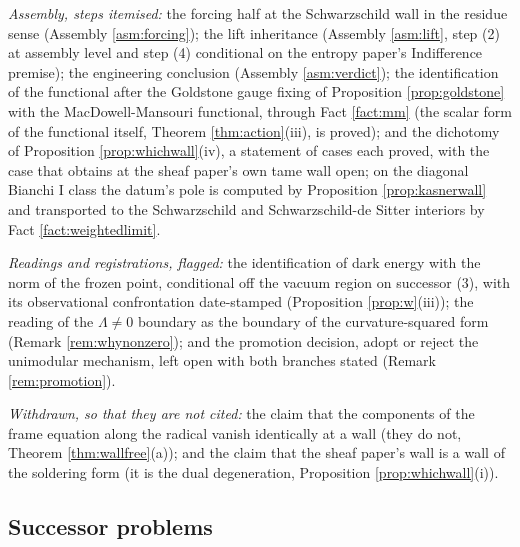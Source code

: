 \documentclass[11pt]{article}
\theoremstyle{definition}
\begin{document}
\emph{Assembly, steps itemised:} the forcing half at the Schwarzschild wall in the residue sense (Assembly \ref{asm:forcing}); the lift inheritance (Assembly \ref{asm:lift}, step (2) at assembly level and step (4) conditional on the entropy paper's Indifference premise); the engineering conclusion (Assembly \ref{asm:verdict}); the identification of the functional after the Goldstone gauge fixing of Proposition \ref{prop:goldstone} with the MacDowell-Mansouri functional, through Fact \ref{fact:mm} (the scalar form of the functional itself, Theorem \ref{thm:action}(iii), is proved); and the dichotomy of Proposition \ref{prop:whichwall}(iv), a statement of cases each proved, with the case that obtains at the sheaf paper's own tame wall open; on the diagonal Bianchi I class the datum's pole is computed by Proposition \ref{prop:kasnerwall} and transported to the Schwarzschild and Schwarzschild-de Sitter interiors by Fact \ref{fact:weightedlimit}.

\emph{Readings and registrations, flagged:} the identification of dark energy with the norm of the frozen point, conditional off the vacuum region on successor (3), with its observational confrontation date-stamped (Proposition \ref{prop:w}(iii)); the reading of the $\Lambda \neq 0$ boundary as the boundary of the curvature-squared form (Remark \ref{rem:whynonzero}); and the promotion decision, adopt or reject the unimodular mechanism, left open with both branches stated (Remark \ref{rem:promotion}).

\emph{Withdrawn, so that they are not cited:} the claim that the components of the frame equation along the radical vanish identically at a wall (they do not, Theorem \ref{thm:wallfree}(a)); and the claim that the sheaf paper's wall is a wall of the soldering form (it is the dual degeneration, Proposition \ref{prop:whichwall}(i)).

\subsection*{Successor problems}
\end{document}
